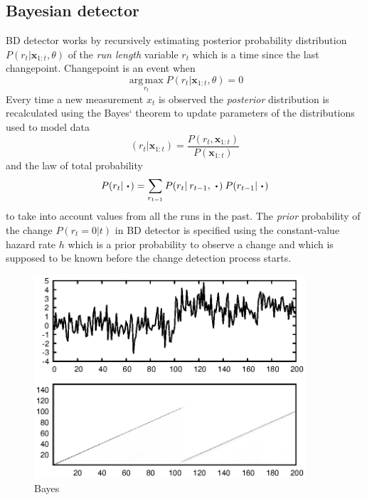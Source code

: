 \documentclass[doctoral,utf8,lot,loar,lof,shortloft,index]{jydiss}
\begin{document}
\subsection{Bayesian detector}

\cite{adams2007bayesian}
BD detector works by recursively estimating posterior probability distribution $P(r_t | \pmb{x}_{1:t}, \theta)$ of the \textit{run length} variable $r_t$ which is a time since the last changepoint.
Changepoint is an event when
\begin{equation}
	\operatorname*{arg\,max}_{r_t} P(r_t | \pmb{x}_{1:t}, \theta) = 0
\end{equation}
Every time a new measurement $x_t$ is observed the \textit{posterior} distribution is recalculated using the Bayes` theorem to update parameters of the distributions used to model data
\[
(r_t | \pmb{x}_{1:t}) = \frac{P(r_t, \pmb{x}_{1:t})}{P(\pmb{x}_{1:t})}
\]
and the law of total probability
\begin{equation}
	P(r_t|\:\LargeCdot) = \sum_{r_{t-1}} P(r_{t} | \: r_{t-1},\:\LargeCdot) \: P(r_{t-1}|\:\LargeCdot)
\end{equation}
to take into account values from all the runs in the past.
The \textit{prior} probability of the change $P(r_t=0|t)$ in BD detector is specified using the constant-value hazard rate $h$ which is a prior probability to observe a change and which is supposed to be known before the change detection process starts.
\begin{figure}[!htb]
	\centering
	\includegraphics[width=0.9\textwidth]{images/example_output_bayes.eps}
	\caption{Bayes}\label{fig:bayes_output_example}
\end{figure}
\end{document}
